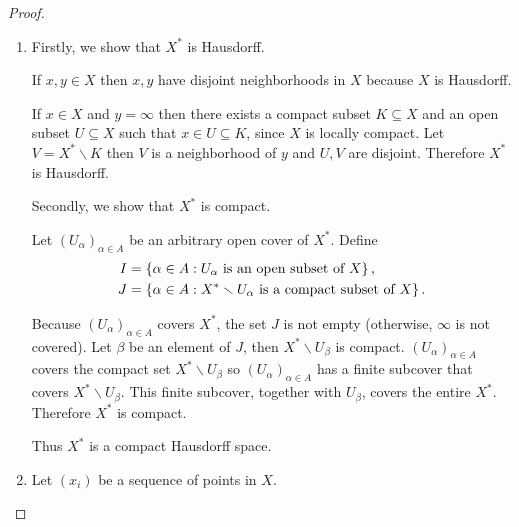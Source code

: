 \begin{proof}
\begin{enumerate}[label={(\alph*)}]
		      If $U$ is an open subset of $X$ and $V$ is not an open subset of $X$ then $X^{*}\smallsetminus V$ is a compact subset of $X$ and $V$ contains $\infty$. $X$ is Hausdorff and $X^{*}\smallsetminus V$ is a compact subset of $X$ so $X^{*}\smallsetminus V$ is a closed subset of $X$. Because $X^{*}\smallsetminus V = X\smallsetminus (V\smallsetminus \set{\infty})$, $V\smallsetminus \set{\infty}$ is an open subset of $X$. Therefore $U\cap V = U \cap (V\smallsetminus \set{\infty})$ is an open subset of $X$.

		      In any cases, $U\cap V \in \mathscr{T}$.

		      Thus $\mathscr{T}$ is a topology on $X^{*}$.
		\item Firstly, we show that $X^{*}$ is Hausdorff.

		      If $x, y \in X$ then $x, y$ have disjoint neighborhoods in $X$ because $X$ is Hausdorff.

		      If $x\in X$ and $y = \infty$ then there exists a compact subset $K\subseteq X$ and an open subset $U\subseteq X$ such that $x\in U\subseteq K$, since $X$ is locally compact. Let $V = X^{*}\smallsetminus K$ then $V$ is a neighborhood of $y$ and $U, V$ are disjoint. Therefore $X^{*}$ is Hausdorff.

		      Secondly, we show that $X^{*}$ is compact.

		      Let ${(U_{\alpha})}_{\alpha\in A}$ be an arbitrary open cover of $X^{*}$. Define
		      \begin{align*}
			      I & = \left\{{\alpha \in A : \text{$U_{\alpha}$ is an open subset of $X$}}\right\},                       \\
			      J & = \left\{{\alpha \in A : \text{$X^{*}\smallsetminus U_{\alpha}$ is a compact subset of $X$}}\right\}.
		      \end{align*}

		      Because ${(U_{\alpha})}_{\alpha\in A}$ covers $X^{*}$, the set $J$ is not empty (otherwise, $\infty$ is not covered). Let $\beta$ be an element of $J$, then $X^{*}\smallsetminus U_{\beta}$ is compact. ${(U_{\alpha})}_{\alpha\in A}$ covers the compact set $X^{*}\smallsetminus U_{\beta}$ so ${(U_{\alpha})}_{\alpha\in A}$ has a finite subcover that covers $X^{*}\smallsetminus U_{\beta}$. This finite subcover, together with $U_{\beta}$, covers the entire $X^{*}$. Therefore $X^{*}$ is compact.

		      Thus $X^{*}$ is a compact Hausdorff space.
		\item Let ${(x_{i})}$ be a sequence of points in $X$.


\end{enumerate}
\end{proof}
